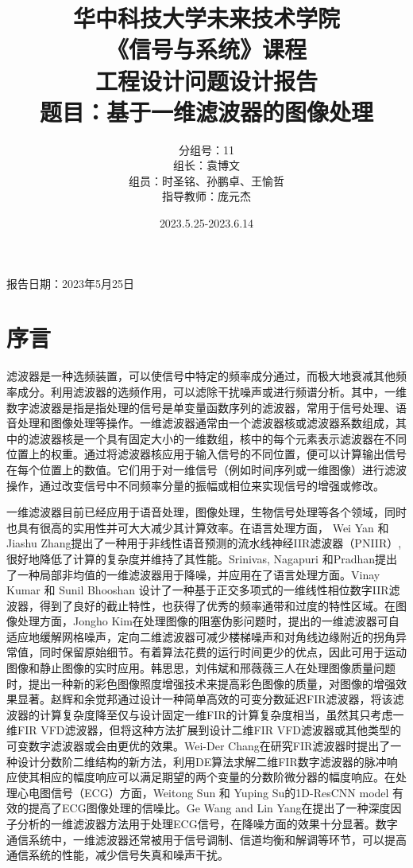\documentclass{article}
\title{\vspace{-1.7cm}\textbf{华中科技大学未来技术学院\\《信号与系统》课程\\\vspace{3.5cm}
                        工程设计问题设计报告\\\vspace{3cm}题目：基于一维滤波器的图像处理\\\vspace{1.5cm}}}
\author{分组号：11\\组长：袁博文\\组员：时圣铭、孙鹏卓、王愉哲\\ 指导教师：庞元杰 }
\date{2023.5.25-2023.6.14}
\begin{document}
\maketitle
\vspace{3cm}
\begin{center}
    报告日期：2023年5月25日
\end{center}
\newpage
\tableofcontents 

\newpage
\section{序言}
滤波器是一种选频装置，可以使信号中特定的频率成分通过，而极大地衰减其他频率成分。利用滤波器的选频作用，可以滤除干扰噪声或进行频谱分析。其中，一维数字滤波器是指是指处理的信号是单变量函数序列的滤波器，常用于信号处理、语音处理和图像处理等操作。一维滤波器通常由一个滤波器核或滤波器系数组成，其中的滤波器核是一个具有固定大小的一维数组，核中的每个元素表示滤波器在不同位置上的权重。通过将滤波器核应用于输入信号的不同位置，便可以计算输出信号在每个位置上的数值。它们用于对一维信号（例如时间序列或一维图像）进行滤波操作，通过改变信号中不同频率分量的振幅或相位来实现信号的增强或修改。

一维滤波器目前已经应用于语音处理，图像处理，生物信号处理等各个领域，同时也具有很高的实用性并可大大减少其计算效率。在语言处理方面，
Wei Yan 和 Jiashu Zhang提出了一种用于非线性语音预测的流水线神经IIR滤波器（PNIIR）\cite{YAN201864},很好地降低了计算的复杂度并维持了其性能。Srinivas, Nagapuri 和Pradhan提出了一种局部非均值的一维滤波器用于降噪，并应用在了语言处理方面\cite{article-speech}。Vinay Kumar 和 Sunil Bhooshan 设计了一种基于正交多项式的一维线性相位数字IIR滤波器\cite{article}，得到了良好的截止特性，也获得了优秀的频率通带和过度的特性区域。在图像处理方面，Jongho Kim在处理图像的阻塞伪影问题时，提出的一维滤波器可自适应地缓解网格噪声，定向二维滤波器可减少楼梯噪声和对角线边缘附近的拐角异常值，同时保留原始细节。有着算法花费的运行时间更少的优点，因此可用于运动图像和静止图像的实时应用\cite{5174477}。韩思思，刘伟斌和邢薇薇三人在处理图像质量问题时，提出一种新的彩色图像照度增强技术来提高彩色图像的质量，对图像的增强效果显著\cite{8328477}。赵辉和余觉邦通过设计一种简单高效的可变分数延迟FIR滤波器，将该滤波器的计算复杂度降至仅与设计固定一维FIR的计算复杂度相当，虽然其只考虑一维FIR VFD滤波器，但将这种方法扩展到设计二维FIR VFD滤波器或其他类型的可变数字滤波器或会由更优的效果\cite{1593976}。Wei-Der Chang在研究FIR滤波器时提出了一种设计分数阶二维结构的新方法，利用DE算法求解二维FIR数字滤波器的脉冲响应使其相应的幅度响应可以满足期望的两个变量的分数阶微分器的幅度响应\cite{CHANG2009660}。在处理心电图信号（ECG）方面，Weitong Sun 和 Yuping Su的1D-ResCNN model 有效的提高了ECG图像处理的信噪比\cite{SUN2020108}。Ge Wang and Lin Yang在提出了一种深度因子分析的一维滤波器方法用于处理ECG信号，在降噪方面的效果十分显著\cite{WANG2020101824}。数字通信系统中，一维滤波器还常被用于信号调制、信道均衡和解调等环节，可以提高通信系统的性能，减少信号失真和噪声干扰。
\end{document}
